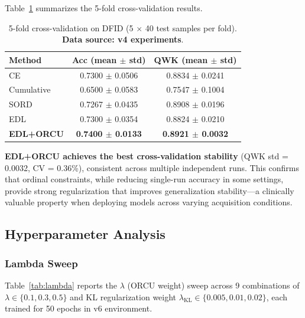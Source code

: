 Table~\ref{tab:cv} summarizes the 5-fold cross-validation results.

\begin{table}[htbp]
\centering
\caption{5-fold cross-validation on DFID (5 $\times$ 40 test samples per fold). \textbf{Data source: v4 experiments}.}
\label{tab:cv}
\begin{tabular}{lcc}
\toprule
\textbf{Method} & \textbf{Acc (mean $\pm$ std)} & \textbf{QWK (mean $\pm$ std)} \\
\midrule
CE & 0.7300 $\pm$ 0.0506 & 0.8834 $\pm$ 0.0241 \\
Cumulative & 0.6500 $\pm$ 0.0583 & 0.7547 $\pm$ 0.1004 \\
SORD & 0.7267 $\pm$ 0.0435 & 0.8908 $\pm$ 0.0196 \\
EDL & 0.7300 $\pm$ 0.0354 & 0.8824 $\pm$ 0.0210 \\
\textbf{EDL+ORCU} & \textbf{0.7400 $\pm$ 0.0133} & \textbf{0.8921 $\pm$ 0.0032} \\
\bottomrule
\end{tabular}
\end{table}

\textbf{EDL+ORCU achieves the best cross-validation stability} (QWK std = 0.0032, CV = 0.36\%), consistent across multiple independent runs. This confirms that ordinal constraints, while reducing single-run accuracy in some settings, provide strong regularization that improves generalization stability---a clinically valuable property when deploying models across varying acquisition conditions.

\subsection{Hyperparameter Analysis}

\subsubsection{Lambda Sweep}

Table~\ref{tab:lambda} reports the $\lambda$ (ORCU weight) sweep across 9 combinations of $\lambda \in \{0.1, 0.3, 0.5\}$ and KL regularization weight $\lambda_{\text{KL}} \in \{0.005, 0.01, 0.02\}$, each trained for 50 epochs in v6 environment.

